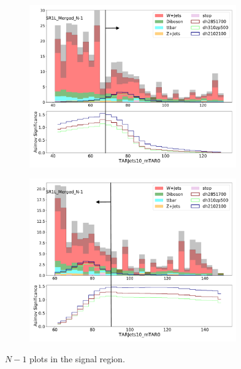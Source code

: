 \begin{figure}[htbp]
\begin{subfigure}{0.49\textwidth}
     \includegraphics[width = 0.98\textwidth]{Figures/4/N1m/TARJets10_mTAR0.pdf}
     \caption{\mTAR}
     \end{subfigure}
     \begin{subfigure}{0.49\textwidth}
     \includegraphics[width = 0.98\textwidth]{Figures/4/N1m/TARJets10_mTAR02.pdf}
     \caption{\mTAR}
     \end{subfigure}

     \caption{$N-1$ plots in the \merged signal region.}
     \label{fig:SRN1}
  \end{figure}
\FloatBarrier

